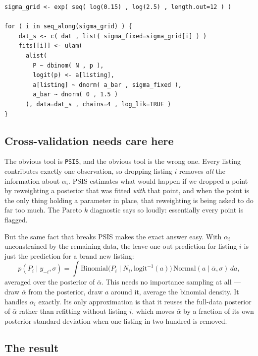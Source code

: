 \documentclass[11pt,a4paper]{article}
\begin{document}
\begin{lstlisting}
sigma_grid <- exp( seq( log(0.15) , log(2.5) , length.out=12 ) )

for ( i in seq_along(sigma_grid) ) {
    dat_s <- c( dat , list( sigma_fixed=sigma_grid[i] ) )
    fits[[i]] <- ulam(
      alist(
        P ~ dbinom( N , p ),
        logit(p) <- a[listing],
        a[listing] ~ dnorm( a_bar , sigma_fixed ),
        a_bar ~ dnorm( 0 , 1.5 )
      ), data=dat_s , chains=4 , log_lik=TRUE )
}
\end{lstlisting}

\subsection{Cross-validation needs care here}

The obvious tool is \texttt{PSIS}, and the obvious tool is the wrong one. Every
listing contributes exactly one observation, so dropping listing $i$ removes
\emph{all} the information about $\alpha_i$. PSIS estimates what would happen if
we dropped a point by reweighting a posterior that was fitted \emph{with} that
point, and when the point is the only thing holding a parameter in place, that
reweighting is being asked to do far too much. The Pareto $k$ diagnostic says so
loudly: essentially every point is flagged.

But the same fact that breaks PSIS makes the exact answer easy. With $\alpha_i$
unconstrained by the remaining data, the leave-one-out prediction for listing
$i$ is just the prediction for a brand new listing:
\[
  p(P_i \mid y_{-i}, \sigma)
  = \int \text{Binomial}\big(P_i \mid N_i, \text{logit}^{-1}(a)\big)\,
         \text{Normal}(a \mid \bar\alpha, \sigma)\, da ,
\]
averaged over the posterior of $\bar\alpha$. This needs no importance sampling
at all --- draw $\bar\alpha$ from the posterior, draw $a$ around it, average the
binomial density. It handles $\alpha_i$ exactly. Its only approximation is that
it reuses the full-data posterior of $\bar\alpha$ rather than refitting without
listing $i$, which moves $\bar\alpha$ by a fraction of its own posterior
standard deviation when one listing in two hundred is removed.

\subsection{The result}
\end{document}
